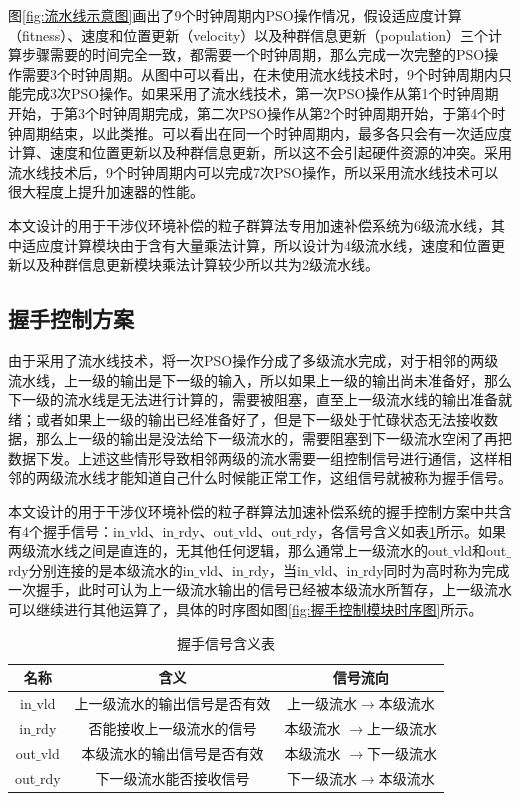 图\ref{fig:流水线示意图}画出了9个时钟周期内PSO操作情况，假设适应度计算（fitness）、速度和位置更新（velocity）以及种群信息更新（population）三个计算步骤需要的时间完全一致，都需要一个时钟周期，那么完成一次完整的PSO操作需要3个时钟周期。从图中可以看出，在未使用流水线技术时，9个时钟周期内只能完成3次PSO操作。如果采用了流水线技术，第一次PSO操作从第1个时钟周期开始，于第3个时钟周期完成，第二次PSO操作从第2个时钟周期开始，于第4个时钟周期结束，以此类推。可以看出在同一个时钟周期内，最多各只会有一次适应度计算、速度和位置更新以及种群信息更新，所以这不会引起硬件资源的冲突。采用流水线技术后，9个时钟周期内可以完成7次PSO操作，所以采用流水线技术可以很大程度上提升加速器的性能。

本文设计的用于干涉仪环境补偿的粒子群算法专用加速补偿系统为6级流水线，其中适应度计算模块由于含有大量乘法计算，所以设计为4级流水线，速度和位置更新以及种群信息更新模块乘法计算较少所以共为2级流水线。

\subsection{握手控制方案}
\label{握手控制方案}
由于采用了流水线技术，将一次PSO操作分成了多级流水完成，对于相邻的两级流水线，上一级的输出是下一级的输入，所以如果上一级的输出尚未准备好，那么下一级的流水线是无法进行计算的，需要被阻塞，直至上一级流水线的输出准备就绪；或者如果上一级的输出已经准备好了，但是下一级处于忙碌状态无法接收数据，那么上一级的输出是没法给下一级流水的，需要阻塞到下一级流水空闲了再把数据下发。上述这些情形导致相邻两级的流水需要一组控制信号进行通信，这样相邻的两级流水线才能知道自己什么时候能正常工作，这组信号就被称为握手信号\cite{LDPC解码器的异步流水线电路研究}。

本文设计的用于干涉仪环境补偿的粒子群算法加速补偿系统的握手控制方案中共含有4个握手信号：in$\_$vld、in$\_$rdy、out$\_$vld、out$\_$rdy，各信号含义如表\ref{tab:握手信号含义表}所示。如果两级流水线之间是直连的，无其他任何逻辑，那么通常上一级流水的out$\_$vld和out$\_$rdy分别连接的是本级流水的in$\_$vld、in$\_$rdy，当in$\_$vld、in$\_$rdy同时为高时称为完成一次握手，此时可认为上一级流水输出的信号已经被本级流水所暂存，上一级流水可以继续进行其他运算了，具体的时序图如图\ref{fig:握手控制模块时序图}所示。
\begin{table}[H]
    \centering
    \caption{握手信号含义表}
    \label{tab:握手信号含义表}
    \begin{tabular}{c|c|c}
        \hline
        名称                               & 含义                   &  信号流向         \\ \hline
        in$\_$vld              & 上一级流水的输出信号是否有效           &上一级流水$\rightarrow$本级流水        \\ \hline
        in$\_$rdy              & 否能接收上一级流水的信号              &本级流水  $\rightarrow$上一级流水       \\ \hline
        out$\_$vld             & 本级流水的输出信号是否有效            & 本级流水 $\rightarrow$下一级流水       \\ \hline
        out$\_$rdy             & 下一级流水能否接收信号                & 下一级流水$\rightarrow$本级流水       \\ \hline
    \end{tabular}
  \end{table}

